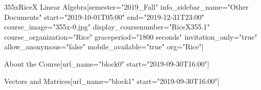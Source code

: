 \documentclass[12pt]{article}
\begin{document}




\def\defaultproblemattributes{attempts="1" showanswer="attempted" rerandomize="per_student"}

\begin{edXcourse}{355x}{RiceX Linear Algebra}[semester="2019_Fall" info_sidebar_name="Other Documents" start="2019-10-01T05:00" end="2019-12-31T23:00" course_image="355x-0.jpg" display_coursenumber="RiceX355.1" course_organization="Rice" graceperiod="1800 seconds" invitation_only="true" allow_anonymous="false" mobile_available="true"  org="Rice"]
 
%  


% 
 

 




\begin{edXchapter}{About the Course}[url_name="block0" start="2019-09-30T16:00"]


\def\edxbaseoutputname{b0about}






\endedxsequential

\end{edXchapter}

\begin{edXchapter}{Vectors and Matrices}[url_name="block1" start="2019-09-30T16:00"]

\def\edxbaseoutputname{b1lineareqns}











\endedxvertical


\end{edXchapter}
\end{edXcourse}
\end{document}
